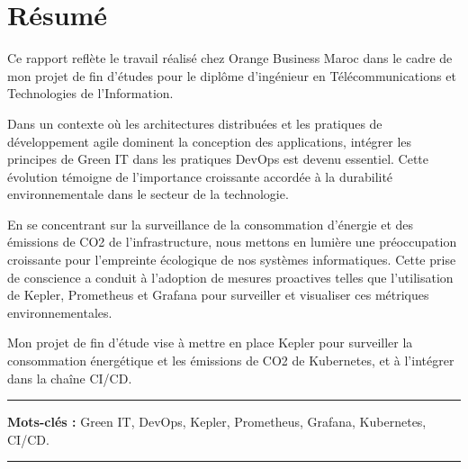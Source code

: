 \chapter*{Résumé}


Ce rapport reflète le travail réalisé chez Orange Business Maroc dans le cadre de mon projet de fin d'études pour le diplôme d'ingénieur en Télécommunications et Technologies de l'Information.

Dans un contexte où les architectures distribuées et les pratiques de développement agile dominent la conception des applications, intégrer les principes de Green IT dans les pratiques DevOps est devenu essentiel. Cette évolution témoigne de l'importance croissante accordée à la durabilité environnementale dans le secteur de la technologie.

En se concentrant sur la surveillance de la consommation d'énergie et des émissions de CO2 de l'infrastructure, nous mettons en lumière une préoccupation croissante pour l'empreinte écologique de nos systèmes informatiques. Cette prise de conscience a conduit à l'adoption de mesures proactives telles que l'utilisation de Kepler, Prometheus et Grafana pour surveiller et visualiser ces métriques environnementales.

Mon projet de fin d'étude vise à mettre en place Kepler pour surveiller la consommation énergétique et les émissions de CO2 de Kubernetes, et à l'intégrer dans la chaîne CI/CD.

\noindent\rule[2pt]{\textwidth}{0.5pt}

{\textbf{Mots-clés :}}
Green IT, DevOps, Kepler, Prometheus, Grafana, Kubernetes, CI/CD.

\noindent\rule[2pt]{\textwidth}{0.5pt}